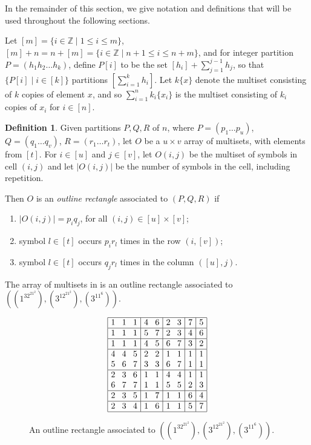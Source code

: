 \documentclass{sn-jnl}
\theoremstyle{definition}
\newtheorem{definition}[theorem]{Definition}
\def \Z {\mathbb Z}
\begin{document}
In the remainder of this section, we give notation and definitions that will be used throughout the following sections.

Let $[m]=\{i \in \Z \mid 1\le i \le m\}$, $[m] + n = n+[m] = \{i \in \Z \mid n+1\le i \le n+m\}$, and for integer partition $P=(h_1h_2\dots h_k)$, define $P[i]$ to be the set $[h_i]+\sum_{j=1}^{j-1} h_j$, so that $\{P[i]\mid i \in [k]\}$ partitions $[\sum_{i=1}^k h_i]$.
Let $k\{x\}$ denote the multiset consisting of $k$ copies of element $x$, and so $\sum_{i=1}^n k_i\{x_i\} $ is the multiset consisting of $k_i$ copies of $x_i$ for $i\in [n]$.

\begin{definition}
    Given partitions $P,Q,R$ of $n$, where $P = (p_1\dots p_u)$, $Q = (q_1\dots q_v)$, $R = (r_1\dots r_t)$, let $O$ be a $u\times v$ array of multisets, with elements from $[t]$. For $i\in [u]$ and $j\in[v]$, let $O(i,j)$ be the multiset of symbols in cell $(i,j)$ and let $|O(i,j)|$ be the number of symbols in the cell, including repetition.

    Then $O$ is an \emph{outline rectangle} associated to $(P,Q,R)$ if
    \begin{enumerate}
        \item $|O(i,j)| = p_iq_j$, for all $(i,j)\in[u]\times[v]$;
        \item symbol $l\in[t]$ occurs $p_ir_l$ times in the row $(i,[v])$;
        \item symbol $l\in[t]$ occurs $q_jr_l$ times in the column $([u],j)$.
    \end{enumerate}
\end{definition}

The array of multisets in  is an outline rectangle associated to $((1^32^21^2),(3^12^21^2),(3^11^6))$.

\begin{figure}[h]
    \centering
$$\arraycolsep=4pt\begin{array}{|ccc|cc|cc|c|c|}\hline
1 & 1 & 1 & 4 & 6 & 2 & 3 & 7 & 5 \\ \hline
1 & 1 & 1 & 5 & 7 & 2 & 3 & 4 & 6 \\ \hline
1 & 1 & 1 & 4 & 5 & 6 & 7 & 3 & 2 \\ \hline
4 & 4 & 5 & 2 & 2 & 1 & 1 & 1 & 1 \\
5 & 6 & 7 & 3 & 3 & 6 & 7 & 1 & 1 \\ \hline
2 & 3 & 6 & 1 & 1 & 4 & 4 & 1 & 1 \\
6 & 7 & 7 & 1 & 1 & 5 & 5 & 2 & 3 \\ \hline
2 & 3 & 5 & 1 & 7 & 1 & 1 & 6 & 4 \\ \hline
2 & 3 & 4 & 1 & 6 & 1 & 1 & 5 & 7 \\ \hline
\end{array}$$
    \caption{An outline rectangle associated to $((1^32^21^2),(3^12^21^2),(3^11^6))$.}
    \label{fig: outline rectangle example}
\end{figure}
\end{document}
